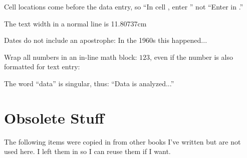 \begin{enumerate}[resume]
Cell locations come before the data entry, so ``In cell , enter '' not ``Enter  in .''

The text width in a normal line is 11.80737cm

Dates do not include an apostrophe: In the 1960s this happened...

Wrap all numbers in an in-line math block: $ 123 $, even if the number is also formatted for text entry: 

The word ``data'' is singular, thus: ``Data is analyzed...''


\section{Obsolete Stuff}
The following items were copied in from other books I've written but are not used here. I left them in so I can reuse them if I want.





\end{enumerate}
